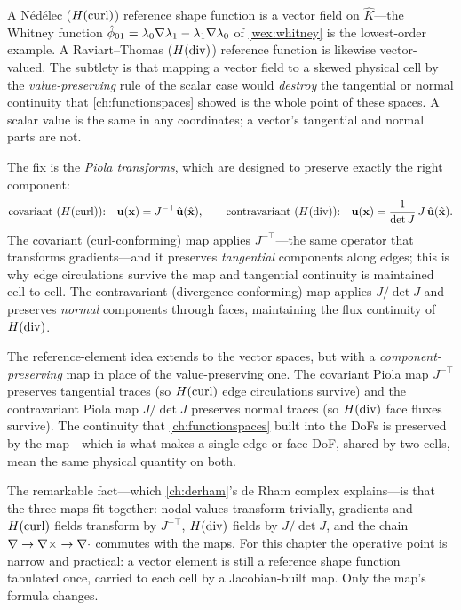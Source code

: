 A N\'ed\'elec ($H(\mathrm{curl})$) reference shape function is a vector field on $\hat K$---the
Whitney function $\hat\phi_{01}=\lambda_0\nabla\lambda_1-\lambda_1\nabla\lambda_0$ of
\cref{wex:whitney} is the lowest-order example. A Raviart--Thomas ($H(\mathrm{div})$) reference
function is likewise vector-valued. The subtlety is that mapping a vector field to a
skewed physical cell by the \emph{value-preserving} rule of the scalar case would
\emph{destroy} the tangential or normal continuity that \cref{ch:functionspaces}
showed is the whole point of these spaces. A scalar value is the same in any
coordinates; a vector's tangential and normal parts are not.

The fix is the \emph{Piola transforms}, which are designed to preserve exactly the
right component:
\[
  \text{covariant (}H(\mathrm{curl})\text{):}\quad \mathbf{u}(\mathbf{x}) = J^{-\top}\hat{\mathbf{u}}(\hat{\mathbf{x}}),
  \qquad
  \text{contravariant (}H(\mathrm{div})\text{):}\quad \mathbf{u}(\mathbf{x}) = \frac{1}{\det J}\,J\,\hat{\mathbf{u}}(\hat{\mathbf{x}}).
\]
The covariant (curl-conforming) map applies $J^{-\top}$---the same operator that
transforms gradients---and it preserves \emph{tangential} components along edges; this
is why edge circulations survive the map and tangential continuity is maintained
cell to cell. The contravariant (divergence-conforming) map applies $J/\det J$ and
preserves \emph{normal} components through faces, maintaining the flux continuity of
$H(\mathrm{div})$.

\begin{keyidea}
The reference-element idea extends to the vector spaces, but with a
\emph{component-preserving} map in place of the value-preserving one. The covariant
Piola map $J^{-\top}$ preserves tangential traces (so $H(\mathrm{curl})$ edge circulations
survive) and the contravariant Piola map $J/\det J$ preserves normal traces (so
$H(\mathrm{div})$ face fluxes survive). The continuity that \cref{ch:functionspaces} built into
the DoFs is preserved by the map---which is what makes a single edge or face DoF,
shared by two cells, mean the same physical quantity on both.
\end{keyidea}

The remarkable fact---which \cref{ch:derham}'s de Rham complex explains---is that the
three maps fit together: nodal values transform trivially, gradients and $H(\mathrm{curl})$
fields transform by $J^{-\top}$, $H(\mathrm{div})$ fields by $J/\det J$, and the chain
$\nabla\to\nabla\times\to\nabla\cdot$ commutes with the maps. For this chapter the operative point is
narrow and practical: a vector element is still a reference shape function tabulated
once, carried to each cell by a Jacobian-built map. Only the map's formula changes.

